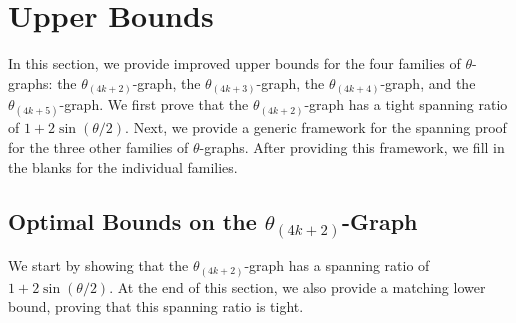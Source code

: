 \documentclass[12pt]{article}
\newcommand{\Graph}[1]{\ensuremath{\theta_{(4 k + #1)}}-Graph\xspace}
\newcommand{\graph}[1]{\ensuremath{\theta_{(4 k + #1)}}-graph\xspace}
\begin{document}
\section{Upper Bounds}
In this section, we provide improved upper bounds for the four families of $\theta$-graphs: the \graph{2}, the \graph{3}, the \graph{4}, and the \graph{5}. We first prove that the \graph{2} has a tight spanning ratio of $1 + 2 \sin (\theta/2)$. Next, we provide a generic framework for the spanning proof for the three other families of $\theta$-graphs. After providing this framework, we fill in the blanks for the individual families. 


\subsection{Optimal Bounds on the \Graph{2}}
\label{subsec:Theta4k+2}
We start by showing that the \graph{2} has a spanning ratio of $1 + 2 \sin (\theta/2)$. At the end of this section, we also provide a matching lower bound, proving that this spanning ratio is tight. 
\end{document}
